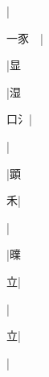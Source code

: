 \begin{multicols}{2}
{{}|{}\par
{\cjk{}一豕{\cnsym{}　}}|{}\par
{\cjk{}{\cnsym{}　}{\cnsym{}　}{\cnsym{}　}}|{\cjk{}显}\par
{}|{\cjk{}湿}\par
{\cjk{}{\cnsym{}　}口{\cnxHanaA{}氵}}|{}\par
{}|{}\par
{\cjk{}{\cnsym{}　}{\cnsym{}　}{\cnsym{}　}}|{\cjk{}顕}\par
{\cjk{}{\cnsym{}　}{\cnsym{}　}禾}|{}\par
{\cjk{}{\cnsym{}　}{\cnsym{}　}{\cnsym{}　}}|{}\par
{\cjk{}{\cnsym{}　}{\cnsym{}　}{\cnsym{}　}}|{\cjk{}曗}\par
{\cjk{}{\cnsym{}　}{\cnsym{}　}立}|{}\par
{\cjk{}{\cnsym{}　}{\cnsym{}　}{\cnsym{}　}}|{}\par
{\cjk{}{\cnsym{}　}{\cnsym{}　}立}|{}\par
{\cjk{}{\cnsym{}　}{\cnsym{}　}{\cnsym{}　}}|{}\par
}
\end{multicols}
